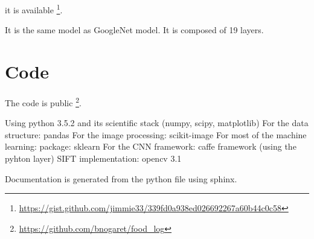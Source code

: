 it is available \footnote{\url{https://gist.github.com/jimmie33/339fd0a938ed026692267a60b44c0c58}}.

It is the same model as GoogleNet model. It is composed of 19 layers.

\section{Code}

The code is public \footnote{\url{https://github.com/bnogaret/food_log}}.

Using python 3.5.2 and its scientific stack (numpy, scipy, matplotlib)
For the data structure: pandas \cite{McKinney2010}
For the image processing: scikit-image \cite{VanderWalt2014}
For most of the machine learning: package: sklearn \cite{Pedregosa2012}
For the CNN framework: caffe framework \cite{Jia2014a} (using the pyhton layer)
SIFT implementation: opencv 3.1 \cite{Bradski2000}

Documentation is generated from the python file using sphinx.